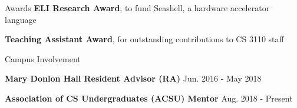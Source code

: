 \documentclass[letterpaper,MMMyyyy,nonstopmode]{simpleresumecv}
\begin{document}
\begin{Body}
\Section
{Awards}{}{}
\BulletItem
\textbf{ELI Research Award}, to fund Seashell, a hardware accelerator language

\BulletItem
\textbf{Teaching Assistant Award}, for outstanding contributions to CS 3110 staff

\Section
{Campus Involvement}{}{}

\BulletItem
\textbf{Mary Donlon Hall Resident Advisor (RA)}
\hfill
Jun. 2016 - May 2018

\BulletItem
\textbf{Association of CS Undergraduates (ACSU) Mentor}
\hfill
Aug. 2018 - Present


\end{Body}
\end{document}
